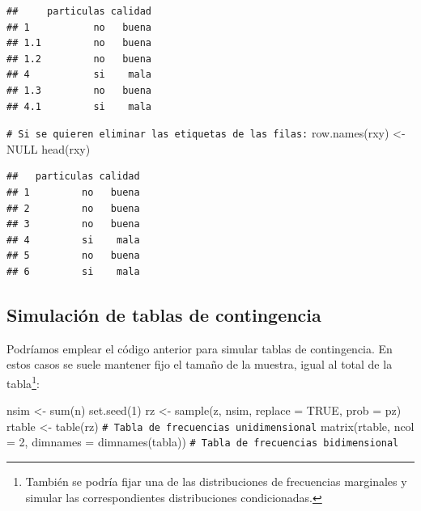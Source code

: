 \documentclass[
]{book}
\newenvironment{Shaded}{\begin{snugshade}}{\end{snugshade}}
\newcommand{\AttributeTok}[1]{\textcolor[rgb]{0.77,0.63,0.00}{#1}}
\newcommand{\CommentTok}[1]{\textcolor[rgb]{0.56,0.35,0.01}{\textit{#1}}}
\newcommand{\ConstantTok}[1]{\textcolor[rgb]{0.00,0.00,0.00}{#1}}
\newcommand{\DecValTok}[1]{\textcolor[rgb]{0.00,0.00,0.81}{#1}}
\newcommand{\FunctionTok}[1]{\textcolor[rgb]{0.00,0.00,0.00}{#1}}
\newcommand{\NormalTok}[1]{#1}
\newcommand{\OtherTok}[1]{\textcolor[rgb]{0.56,0.35,0.01}{#1}}
\theoremstyle{break}
\theoremstyle{nonumberplain}
\renewcommand{\CommentTok}[1]{\textcolor[rgb]{0.41,0.41,0.41}{\texttt{#1}}}
\begin{document}
\begin{verbatim}
##     particulas calidad
## 1           no   buena
## 1.1         no   buena
## 1.2         no   buena
## 4           si    mala
## 1.3         no   buena
## 4.1         si    mala
\end{verbatim}

\begin{Shaded}
\begin{Highlighting}[]
\CommentTok{\# Si se quieren eliminar las etiquetas de las filas:}
\FunctionTok{row.names}\NormalTok{(rxy) }\OtherTok{\textless{}{-}} \ConstantTok{NULL}
\FunctionTok{head}\NormalTok{(rxy)}
\end{Highlighting}
\end{Shaded}

\begin{verbatim}
##   particulas calidad
## 1         no   buena
## 2         no   buena
## 3         no   buena
## 4         si    mala
## 5         no   buena
## 6         si    mala
\end{verbatim}

\hypertarget{simconting}{%
\subsection{Simulación de tablas de contingencia}\label{simconting}}

Podríamos emplear el código anterior para simular tablas de contingencia.
En estos casos se suele mantener fijo el tamaño de la muestra, igual al total de la tabla\footnote{También se podría fijar una de las distribuciones de frecuencias marginales y simular las correspondientes distribuciones condicionadas.}:

\begin{Shaded}
\begin{Highlighting}[]
\NormalTok{nsim }\OtherTok{\textless{}{-}} \FunctionTok{sum}\NormalTok{(n)}
\FunctionTok{set.seed}\NormalTok{(}\DecValTok{1}\NormalTok{)}
\NormalTok{rz }\OtherTok{\textless{}{-}} \FunctionTok{sample}\NormalTok{(z, nsim, }\AttributeTok{replace =} \ConstantTok{TRUE}\NormalTok{, }\AttributeTok{prob =}\NormalTok{ pz)}
\NormalTok{rtable }\OtherTok{\textless{}{-}} \FunctionTok{table}\NormalTok{(rz) }\CommentTok{\# Tabla de frecuencias unidimensional}
\FunctionTok{matrix}\NormalTok{(rtable, }\AttributeTok{ncol =} \DecValTok{2}\NormalTok{, }\AttributeTok{dimnames =} \FunctionTok{dimnames}\NormalTok{(tabla)) }\CommentTok{\# Tabla de frecuencias bidimensional}
\end{Highlighting}
\end{Shaded}
\end{document}
